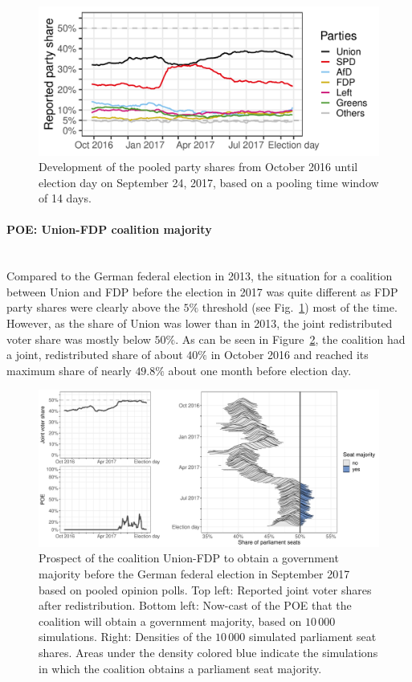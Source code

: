 \documentclass[smallextended]{svjour3}      %
\begin{document}
\begin{figure}[H]\centering
\includegraphics[width=.8\textwidth]{figures/2017_pooled_rawShares.pdf}
\caption{Development of the pooled party shares from October 2016 until
election day on September 24, 2017, based on a pooling time window of 14 days.
\label{fig:2017}
}
\end{figure}


\paragraph{POE: Union-FDP coalition majority} \ \\
Compared to the German federal election in 2013, the situation for a
coalition between Union and FDP before the election in 2017
was quite different as FDP party shares were
clearly above the $5\%$ threshold (see Fig.~\ref{fig:2017}) most of the time.
However, as the share of Union was lower than in 2013,
the joint redistributed voter share was mostly below $50\%$.
As can be seen in Figure~\ref{fig:2017_cdufdp}, the coalition had
a joint, redistributed share of about $40\%$ in October 2016
and reached its maximum share of nearly $49.8\%$ about one month
before election day.

\begin{figure}[H]\centering
\includegraphics[width=1\textwidth]{figures/cdufdp_2017_joint.pdf}
\caption{Prospect of the coalition Union-FDP to obtain a government majority before the
German federal election in September 2017 based on pooled opinion polls.
Top left: Reported joint voter shares after redistribution.
Bottom left: Now-cast of the POE that the coalition will obtain a government
majority, based on $10\,000$ simulations.
Right: Densities of the $10\,000$ simulated parliament seat shares. Areas under
the density colored blue indicate the simulations in which the coalition
obtains a parliament seat majority.
\label{fig:2017_cdufdp}
}
\end{figure}
\end{document}
